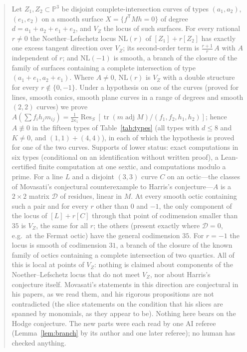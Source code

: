 \documentclass[11pt]{article}
\numberwithin{equation}{section}
\theoremstyle{remark}
\newcommand{\PP}{\mathbb{P}}
\newcommand{\NL}{\mathrm{NL}}
\newcommand{\VZ}{V_Z}
\newcommand{\cD}{\mathcal{D}}
\newcommand{\Res}{\operatorname{Res}}
\newcommand{\adj}{\operatorname{adj}}
\begin{document}
\begin{abstract}
Let $Z_1,Z_2\subset\PP^3$ be disjoint complete-intersection curves of types $(a_1,a_2)$, $(e_1,e_2)$ on a smooth
surface $X=\{f^{\mathsf T}Mh=0\}$ of degree $d=a_1+a_2+e_1+e_2$, and $\VZ$ the locus of such surfaces. For every
rational $r\neq0$ the Noether--Lefschetz locus $\NL(r)$ of $[Z_1]+r[Z_2]$ has exactly one excess tangent
direction over $\VZ$; its second-order term is $\frac{r+1}{r}\,A$ with $A$ independent of $r$; and $\NL(-1)$ is
smooth, a branch of the closure of the family of surfaces containing a complete intersection of type
$(a_1+e_1,a_2+e_1)$. Where $A\neq0$, $\NL(r)$ is $\VZ$ with a double structure for every $r\notin\{0,-1\}$. Under
a hypothesis on one of the curves (proved for lines, smooth conics, smooth plane curves in a range of degrees
and smooth $(2,2)$ curves) we prove
$A(\sum f_ih_jm_{ij})=\frac1{2\kappa_1}\Res_S[\operatorname{tr}(m\adj M)/(f_1,f_2,h_1,h_2)]$; hence
$A\not\equiv0$ in the fifteen types of Table~\ref{tab:types} (all types with $d\le8$ and $K\ne0$, and
$(1,1)+(4,4)$), in each of which the hypothesis is proved for one of the two curves. Supports of lower status: exact computations in six types
(conditional on an identification without written proof), a Lean-certified finite computation at one sextic,
and computations modulo a prime. For a line $L$ and a disjoint $(3,3)$ curve $C$ on an octic---the classes of
Movasati's conjectural counterexample to Harris's conjecture---$A$ is a $2\times2$ matrix $\cD$ of residues,
linear in $M$. At every smooth octic containing such a pair and for every $r$ other than $0$ and $-1$, the only
component of the locus of $[L]+r[C]$ through that point of codimension smaller than $35$ is $\VZ$, the same for
all $r$; the others (present exactly where $\cD=0$, e.g.\ at the Fermat octic) have the general codimension
$35$. For $r=-1$ the locus is smooth of codimension $31$, a branch of the closure of the known family of octics
containing a complete intersection of two quartics. All of this is local at points of $\VZ$: nothing is claimed
about components of the Noether--Lefschetz locus that do not meet $\VZ$, nor about Harris's conjecture itself.
Movasati's statements in this direction are conjectural in his papers, as we read them, and his rigorous propositions are not
contradicted (the slice statements on the condition that his slices are spanned by monomials, as they appear to
be). Nothing here bears on the Hodge conjecture. The new parts were each read by one AI referee (Lemma~\ref{lem:branch} by its author
and one later referee); no human has checked anything.
\end{abstract}
\end{document}
